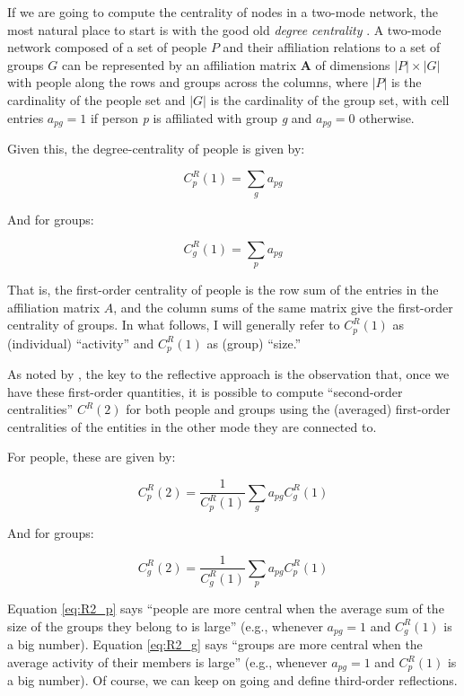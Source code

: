 \documentclass[a4paper,fleqn]{cas-sc}
\begin{document}
If we are going to compute the centrality of nodes in a two-mode network, the most natural place to start is with the good old \textit{degree centrality} \citep{faust1997centrality}. A two-mode network composed of a set of people $P$ and their affiliation relations to a set of groups $G$ can be represented by an affiliation matrix $\mathbf{A}$ of dimensions $|P| \times |G|$ with people along the rows and groups across the columns, where $|P|$ is the cardinality of the people set and $|G|$ is the cardinality of the group set, with cell entries $a_{pg}= 1$ if person \textit{p} is affiliated with group \textit{g} and $a_{pg}= 0$ otherwise. 

Given this, the degree-centrality of people is given by:

\begin{equation}
    C^R_p(1) = \sum_g a_{pg}
    \label{eq:R1_p}
\end{equation}

And for groups:

\begin{equation}
   C^R_g(1) = \sum_p a_{pg}
  \label{eq:R1_g}
\end{equation}

That is, the first-order centrality of people is the row sum of the entries in the affiliation matrix $A$, and the column sums of the same matrix give the first-order centrality of groups. In what follows, I will generally refer to $C^R_p(1)$ as (individual) ``activity'' and $C^R_p(1)$ as (group) ``size.''  

As noted by \citet{hidalgo2009building}, the key to the reflective approach is the observation that, once we have these first-order quantities, it is possible to compute ``second-order centralities'' $C^R(2)$ for both people and groups using the (averaged) first-order centralities of the entities in the other mode they are connected to. 

For people, these are given by:

\begin{equation}
    C^R_p(2) = \frac{1}{C^R_p(1)}\sum_g a_{pg}C^R_g(1)
    \label{eq:R2_p}
\end{equation}

And for groups:

\begin{equation}
   C^R_g(2) = \frac{1}{C^R_g(1)}\sum_p a_{pg}C^R_p(1)
    \label{eq:R2_g}
\end{equation}

Equation \ref{eq:R2_p} says ``people are more central when the average sum of the size of the groups they belong to is large'' (e.g., whenever $a_{pg} = 1$ and $C^R_g(1)$ is a big number). Equation \ref{eq:R2_g} says ``groups are more central when the average activity of their members is large'' (e.g., whenever $a_{pg} = 1$ and $C^R_p(1)$ is a big number). Of course, we can keep on going and define third-order reflections. 
\end{document}
